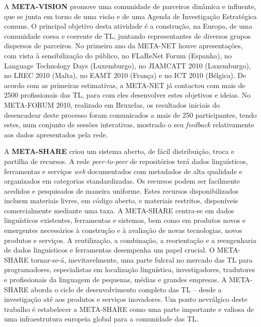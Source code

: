 \documentclass[]{../metanetpaper}
\begin{document}
\begin{multicols}{2}
A \textbf{META-VISION} promove uma comunidade de parceiros dinâmica e influente, que se junta em torno de uma visão e de uma Agenda de Investigação Estratégica comuns. O principal objetivo desta atividade é a construção, na Europa, de uma comunidade coesa e coerente de TL, juntando representantes de diversos grupos dispersos de parceiros. No primeiro ano da META-NET houve apresentações, com vista à sensibilização do público, no FLaReNet Forum (Espanha), no Language Technology Days (Lu\-xem\-bur\-go), no JIAMCATT 2010 (Luxemburgo), no LREC 2010 (Malta), no EAMT 2010 (França) e no ICT 2010 (Bélgica). De acordo com as  primeiras estimativas, a META-NET já contactou com mais de 2500 profissionais das TL, para com eles desenvolver estes objetivos e ideias. No META-FORUM 2010, realizado em Bruxelas, os resultados iniciais do desencadear deste processo foram comunicados a mais de 250 participantes, tendo estes, num conjunto de sessões interativas, mostrado o seu \textit{feedback} relativamente aos dados apresentados pela rede.

A \textbf{META-SHARE} criou um sistema aberto, de fácil distribuição, troca e partilha de recursos. A rede \textit{peer-to-peer} de repositórios terá dados linguísticos, ferramentas e serviços \textit{web} documentados com metadados de alta qualidade e organizados em categorias standardizadas. Os recursos podem ser facilmente acedidos e pesquisados de maneira uniforme. Estes recursos disponibilizados incluem materiais livres, em código aberto, e materiais restritos, disponíveis comercialmente mediante uma taxa. A META-SHARE centra-se em dados linguísticos existentes, ferramentas e sistemas, bem como em produtos novos e emergentes necessários à construção e à avaliação de novas tecnologias, novos produtos e serviços. A reutilização, a combinação, a reorientação e a reengenharia de dados linguísticos e ferramentas desempenha um papel crucial. O META- SHARE tornar-se-á, inevitavelmente, uma parte fulcral no mercado das TL para programadores, especialistas em localização linguística, investigadores, tradutores e profissionais da linguagem de pequenas, médias e grandes empresas. A META-SHARE aborda o ciclo de desenvolvimento completo das TL – desde a investigação até aos produtos e serviços inovadores. Um ponto nevrálgico deste trabalho é estabelecer a META-SHARE como uma parte importante e valiosa de uma infraestrutura europeia global para a comunidade das TL.


\end{multicols}
\end{document}
